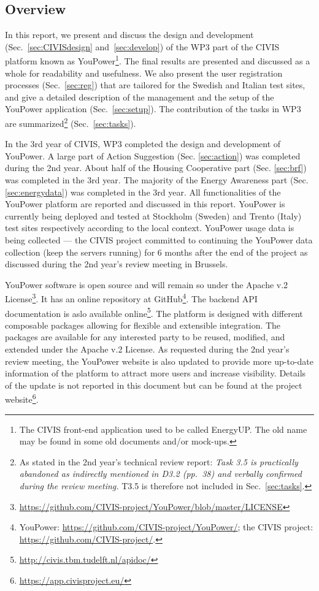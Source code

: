 \subsection{Overview}

In this report, we present and discuss the design and development (Sec.~\ref{sec:CIVISdesign} and~\ref{sec:develop}) of the WP3 part of the CIVIS platform known as YouPower\footnote{The CIVIS front-end application used to be called EnergyUP. The old name may be found in some old documents and/or mock-ups.}. 
The final results are presented and discussed as a whole for readability and usefulness. 
% 
We also present the user registration processes (Sec.~\ref{sec:reg}) that are tailored for the Swedish and Italian test sites, and give a detailed description of the management and the setup of the YouPower application (Sec.~\ref{sec:setup}). The contribution of the tasks in WP3 are summarized\footnote{As stated in the 2nd year's technical review report: \textit{Task 3.5 is practically abandoned as indirectly mentioned in D3.2 (pp.~38) and verbally confirmed
during the review meeting.} T3.5 is therefore not included in Sec.~\ref{sec:tasks}.} (Sec.~\ref{sec:tasks}). 

In the 3rd year of CIVIS, WP3 completed the design and development of YouPower. A large part of Action Suggestion (Sec. \ref{sec:action}) was completed during the 2nd year. About half of the Housing Cooperative part (Sec. \ref{sec:brf}) was completed in the 3rd year. The majority of the Energy Awareness part (Sec. \ref{sec:energydata}) was completed in the 3rd year. 
All functionalities of the YouPower platform are reported and discussed in this report. YouPower is currently being deployed and tested at Stockholm (Sweden) and Trento (Italy) test sites respectively according to the local context. YouPower usage data is being collected --- the CIVIS project committed to continuing the YouPower data collection (keep the servers running) for 6 months after the end of the project as discussed during the 2nd year's review meeting in Brussels. 

YouPower software is open source and will remain so under the Apache v.2 License\footnote{\url{https://github.com/CIVIS-project/YouPower/blob/master/LICENSE}}. It has  an online repository at GitHub\footnote{YouPower: \url{https://github.com/CIVIS-project/YouPower/}; the CIVIS project: \url{https://github.com/CIVIS-project/}.}. 
The backend API documentation is aslo available online\footnote{\url{http://civis.tbm.tudelft.nl/apidoc/}}. The platform is designed with different composable packages allowing for flexible and extensible integration. The packages are available for any interested party to be reused, modified, and extended under the Apache v.2 License. As requested during the 2nd year's review meeting, the YouPower website is also updated to provide more up-to-date information of the platform to attract more users and increase visibility. Details of the update is not reported in this document but can be found at the project website\footnote{\url{https://app.civisproject.eu/}}.

